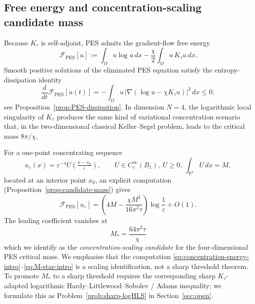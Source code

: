 \documentclass[11pt,reqno]{amsart}
\theoremstyle{definition}
\theoremstyle{remark}
\newcommand{\R}{\mathbb{R}}
\newcommand{\Free}{\mathcal{F}}
\begin{document}
\subsection{Free energy and concentration-scaling candidate mass}
\label{subsec:free-energy-intro}

Because $K_\tau$ is self-adjoint, PES admits the gradient-flow free energy
\begin{equation}\label{eq:PES-free-energy-intro}
        \Free_{\mathrm{PES}}[u]
        :=\int_{\Omega}u\log u\,dx
        -\frac{\chi}{2}\int_{\Omega}u\,K_\tau u\,dx.
\end{equation}
Smooth positive solutions of the eliminated PES equation satisfy the entropy-dissipation identity
\begin{equation}\label{eq:PES-dissipation-intro}
        \frac{d}{dt}\Free_{\mathrm{PES}}[u(t)]
        =-\int_{\Omega}u\,\bigl|\nabla(\log u-\chi K_\tau u)\bigr|^{2}\,dx
        \le 0;
\end{equation}
see Proposition~\ref{prop:PES-dissipation}. In dimension $N=4$, the logarithmic local singularity of $K_\tau$ produces the same kind of variational concentration scenario that, in the two-dimensional classical Keller--Segel problem, leads to the critical mass $8\pi/\chi$.

For a one-point concentrating sequence
\begin{equation}\label{eq:concentration-intro}
        u_\varepsilon(x)=\varepsilon^{-4}U\!\left(\tfrac{x-x_0}{\varepsilon}\right),
        \qquad
        U\in C_c^{\infty}(B_{1}),
        \ U\ge 0,
        \ \int_{\R^{4}}U\,dx=M,
\end{equation}
located at an interior point $x_0$, an explicit computation (Proposition~\ref{prop:candidate-mass}) gives
\begin{equation}\label{eq:concentration-energy-intro}
        \Free_{\mathrm{PES}}[u_\varepsilon]
        =\left(4M-\frac{\chi M^{2}}{16\pi^{2}\tau}\right)\log\frac{1}{\varepsilon}+O(1).
\end{equation}
The leading coefficient vanishes at
\begin{equation}\label{eq:M-star-intro}
        M_{\!*}=\frac{64\pi^{2}\tau}{\chi}
\end{equation}
which we identify as the \emph{concentration-scaling candidate} for the four-dimensional PES critical mass. We emphasise that the computation \eqref{eq:concentration-energy-intro}--\eqref{eq:M-star-intro} is a scaling identification, not a sharp threshold theorem. To promote $M_{\!*}$ to a sharp threshold requires the corresponding sharp $K_\tau$-adapted logarithmic Hardy--Littlewood--Sobolev / Adams inequality; we formulate this as Problem~\ref{prob:sharp-logHLS} in Section~\ref{sec:open}.
\end{document}
